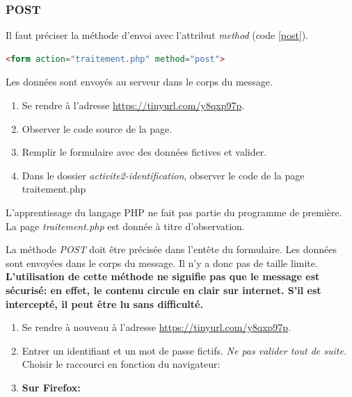 \documentclass[a4paper,11pt]{article}
\begin{document}
\begin{Form}
\subsubsection{POST}
Il faut préciser la méthode d'envoi avec l'attribut \emph{method} (code \ref{post}).
\begin{center}
\begin{lstlisting}[language=HTML]
<form action="traitement.php" method="post">
\end{lstlisting}
\label{post}
\end{center}
Les données sont envoyés au serveur dans le corps du message.
\begin{activite}
\begin{enumerate}
\item Se rendre à l'adresse \url{https://tinyurl.com/y8qxp97p}.
\item Observer le code source de la page.
\item Remplir le formulaire avec des données fictives et valider.
\item Dans le dossier \emph{activite2-identification}, observer le code de la page traitement.php
\end{enumerate}
\end{activite}
\begin{aretenir}[Remarque]
L'apprentissage du langage PHP ne fait pas partie du programme de première. La page \emph{traitement.php} est donnée à titre d'observation.
\end{aretenir}
\begin{aretenir}[]
La méthode \emph{POST} doit être précisée dans l'entête du formulaire. Les données sont envoyées dans le corps du message. Il n'y a donc pas de taille limite.\\
\textbf{L'utilisation de cette méthode ne signifie pas que le message est sécurisé: en effet, le contenu circule en clair sur internet. S'il est intercepté, il peut être lu sans difficulté.}
\end{aretenir}
\begin{activite}
\begin{enumerate}
\item Se rendre à nouveau à l'adresse \url{https://tinyurl.com/y8qxp97p}.
\item Entrer un identifiant et un mot de passe fictifs. \emph{Ne pas valider tout de suite.}
\\Choisir le raccourci en fonction du navigateur:
\item \textbf{Sur Firefox:}

\end{enumerate}
\end{activite}
\end{Form}
\end{document}
